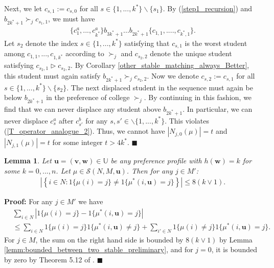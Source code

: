 \documentclass[12pt, fullpage]{amsart}
\newtheorem{lemma}{Lemma}[section]
\theoremstyle{definition}
\theoremstyle{definition}
\theoremstyle{definition}
\begin{document}
\begin{bibunit}[econometrica]
Next, we let $c_{s,1}:=c_{s,0}$ for all $s\in \{1,...,k^{*}\}\backslash\{ s_1\}$. By (\ref{step1_recursion}) and $b_{2k^{*}+1}\succ_{j}c_{s_1,1}$, we must have
\begin{align}\label{step2_recursion}
	\{c_{1}^{a},...,c_{k^{*}}^{a}\}b_{3k^{*}+1}...b_{2k^{*}+1}\{c_{1,1},....,c_{k^{*},1}\}.
\end{align}
Let $s_2$ denote the index  $s\in \{ 1,...,k^{*}\}$ satisfying that $c_{s,1}$ is the worst student among $c_{1,1},...,c_{1,k^{*}}$ according to $\succ_{j}$ and $c_{s_2,2}$ denote the unique student  satisfying $c_{s_2,1}\vartriangleright c_{s_2,2}$. By Corollary \ref{other_stable_matching_always_Better}, this student must again satisfy $b_{2k^{*}+1}\succ_{j}c_{s_2,2}$.   Now we denote $c_{s,2}:=c_{s,1}$ for all $s\in \{1,...,k^{*}\}\backslash\{s_2\}$.  The next displaced student in the sequence must again be below $b_{2k^{*}+1}$ in the preference of college $\succ_j$. By continuing in this fashion, we find that we can never displace any student above $b_{2k^{*}+1}$. In particular, we can never displace $c_{s}^{a}$ after $c_{s'}^{b}$ for any $s,s'\in \backslash\{1,...,k^{*}\}$. This violates (\ref{T_operator_analogue_2}). Thus, we cannot have $|N_{j,0}(\mu)|= t$ and $|N_{j,1}(\mu)|= t$ for some integer $t>4k^{*}$. $\blacksquare$

	
\begin{lemma}\label{lemm:bounded_between_two_stable} Let $\boldsymbol{u} = (\boldsymbol{v},\boldsymbol{w}) \in\mathbb{U}$ be any preference profile with $h(\boldsymbol{w}) =k$ for some $k =0,...,n$. Let $\mu \in  \mathcal{S}(N,M,\boldsymbol{u})$. Then for any $j\in M'$:
	\begin{align}
		\label{eq:5pt1ii2-1-1-3}
		\left|\left\{i\in N:1\{\mu(i) = j\} \ne  1\{\mu^{*}(i,\boldsymbol{u}) = j\}\right\} \right|\leq 8(k\vee1).
	\end{align}
\end{lemma}

\noindent \textbf{Proof: } For any $j\in M'$ we have
\begin{align}
	\label{eq:college_j_bound2}
	& \sum_{i\in N} \left|1\{\mu(i)=j\}-1\{\mu^{*}(i,\boldsymbol{u})=j\} \right| 
	\nonumber \\
	& \le \sum_{i\in N}1\{\mu(i)=j\}1\{\mu^{*}(i,\boldsymbol{u})\neq j\} +\sum_{i'\in N}1\{\mu(i)\neq j\}1\{\mu^{*}(i,\boldsymbol{u})=j\}.\nonumber
\end{align}
For $j\in M$, the sum on the right hand side is bounded by $8(k \vee 1)$ by Lemma \ref{lemm:bounded_between_two_stable_preliminary}, and for $j=0$, it is bounded by zero by Theorem 5.12 of \cite{Roth/Sotomayor:90:TwoSidedMatching}. $\blacksquare $


\end{bibunit}
\end{document}
